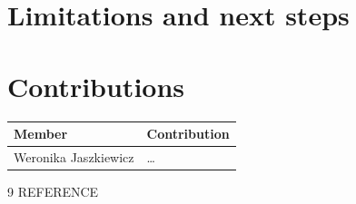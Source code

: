 \documentclass[11pt,a4paper]{article}
\begin{document}
\section{Limitations and next steps}

\appendix
\section*{Contributions}
\begin{tabular}{lp{12cm}}\toprule
Member & Contribution \\\midrule
Weronika Jaszkiewicz & \dots \\
\bottomrule
\end{tabular}

\begin{thebibliography}{9}
 REFERENCE
\end{thebibliography}
\end{document}
